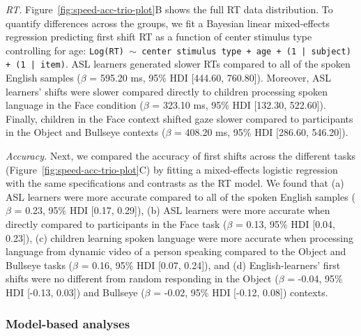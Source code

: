 \documentclass[,man,floatsintext]{apa6}
\begin{document}
\emph{RT.} Figure~\ref{fig:speed-acc-trio-plot}B shows the full RT data
distribution. To quantify differences across the groups, we fit a
Bayesian linear mixed-effects regression predicting first shift RT as a
function of center stimulus type controlling for age:
\texttt{Log(RT) $\sim$ center stimulus type + age +  (1 | subject) + (1 | item)}.
ASL learners generated slower RTs compared to all of the spoken English
samples (\(\beta\) = 595.20 ms, 95\% HDI {[}444.60, 760.80{]}).
Moreover, ASL learners' shifts were slower compared directly to children
processing spoken language in the Face condition (\(\beta\) = 323.10 ms,
95\% HDI {[}132.30, 522.60{]}). Finally, children in the Face context
shifted gaze slower compared to participants in the Object and Bullseye
contexts (\(\beta\) = 408.20 ms, 95\% HDI {[}286.60, 546.20{]}).

\emph{Accuracy.} Next, we compared the accuracy of first shifts across
the different tasks (Figure~\ref{fig:speed-acc-trio-plot}C) by fitting a
mixed-effects logistic regression with the same specifications and
contrasts as the RT model. We found that (a) ASL learners were more
accurate compared to all of the spoken English samples (\(\beta\) =
0.23, 95\% HDI {[}0.17, 0.29{]}), (b) ASL learners were more accurate
when directly compared to participants in the Face task (\(\beta\) =
0.13, 95\% HDI {[}0.04, 0.23{]}), (c) children learning spoken language
were more accurate when processing language from dynamic video of a
person speaking compared to the Object and Bullseye tasks (\(\beta\) =
0.16, 95\% HDI {[}0.07, 0.24{]}), and (d) English-learners' first shifts
were no different from random responding in the Object (\(\beta\) =
-0.04, 95\% HDI {[}-0.13, 0.03{]}) and Bullseye (\(\beta\) = -0.02, 95\%
HDI {[}-0.12, 0.08{]}) contexts.

\subsubsection{Model-based analyses}\label{model-based-analyses}
\end{document}

